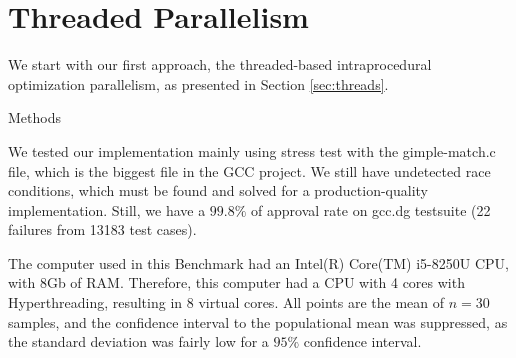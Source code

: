 \section{Threaded Parallelism}

We start with our first approach, the threaded-based intraprocedural optimization
parallelism, as presented in Section \ref{sec:threads}.

\begin{subsection}{Methods}

We tested our implementation mainly using stress test with the gimple-match.c
file, which is the biggest file in the GCC project. We still have undetected
race conditions, which must be found and solved for a production-quality
implementation. Still, we have a $99.8\%$ of approval rate on gcc.dg testsuite (22
failures from 13183 test cases).

The computer used in this Benchmark had an Intel(R) Core(TM) i5-8250U CPU, with
8Gb of RAM.  Therefore, this computer had a CPU with 4 cores with
Hyperthreading, resulting in 8 virtual cores. All points are the mean of $n = 30$
samples, and the confidence interval to the populational mean was suppressed,
as the standard deviation was fairly low for a $95\%$ confidence interval. 

\end{subsection}

